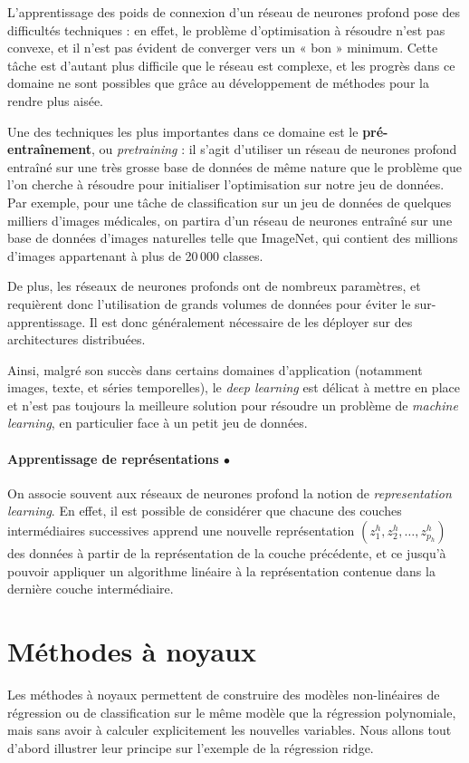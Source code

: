 L'apprentissage des poids de connexion d'un réseau de neurones profond pose des
difficultés techniques : en effet, le problème d'optimisation à résoudre n'est
pas convexe, et il n'est pas évident de converger vers un « bon »
minimum. Cette tâche est d'autant plus difficile que le réseau est complexe, et
les progrès dans ce domaine ne sont possibles que grâce au développement de
méthodes pour la rendre plus aisée.

Une des techniques les plus importantes dans ce domaine est le
\textbf{pré-entraînement}, ou \textit{pretraining} : il s'agit d'utiliser un
réseau de neurones profond entraîné sur une très grosse base de données de même
nature que le problème que l'on cherche à résoudre pour initialiser
l'optimisation sur notre jeu de données. Par exemple, pour une tâche de
classification sur un jeu de données de quelques milliers d'images médicales,
on partira d'un réseau de neurones entraîné sur une base de données d'images
naturelles telle que ImageNet, qui contient des millions d'images appartenant à
plus de 20\,000 classes.

De plus, les réseaux de neurones profonds ont de nombreux paramètres, et
requièrent donc l'utilisation de grands volumes de données pour éviter le
sur-apprentissage. Il est donc généralement nécessaire de les déployer sur des
architectures distribuées.

Ainsi, malgré son succès dans certains domaines d'application (notamment
images, texte, et séries temporelles), le \textit{deep learning} est délicat à
mettre en place et n'est pas toujours la meilleure solution pour résoudre un
problème de \textit{machine learning}, en particulier face à un petit jeu de
données.

\paragraph{Apprentissage de représentations $\bullet$}
On associe souvent aux réseaux de neurones profond la notion de {\it
  representation learning}. En effet, il est possible de considérer que chacune
des couches intermédiaires successives apprend une nouvelle représentation
$(z^h_1, z^h_2, \dots, z^h_{p_h})$ des données à partir de la représentation de
la couche précédente, et ce jusqu'à pouvoir appliquer un algorithme linéaire à
la représentation contenue dans la dernière couche intermédiaire.


\section{Méthodes à noyaux}
Les méthodes à noyaux permettent de construire des modèles non-linéaires de
régression ou de classification sur le même modèle que la régression
polynomiale, mais sans avoir à calculer explicitement les nouvelles variables. 
Nous allons tout d'abord illustrer leur principe sur l'exemple de la régression ridge.


